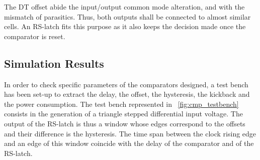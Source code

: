 The DT offset abide the input/output common mode alteration, and with the mismatch of parasitics. Thus, both outputs shall be connected to almost similar cells. An RS-latch fits this purpose as it also keeps the decision made once the comparator is reset.

    \subsection{Simulation Results}              %
\label{sec:latches_sim}
In order to check specific parameters of the comparators designed, a test bench has been set-up to extract the delay, the offset, the hysteresis, the kickback and the power consumption. The test bench represented in \figurename~\ref{fig:cmp_testbench} consists in the generation of a triangle stepped differential input voltage. The output of the RS-latch is thus a window whose edges correspond to the offsets and their difference is the hysteresis. The time span between the clock rising edge and an edge of this window coincide with the delay of the comparator and of the RS-latch.

